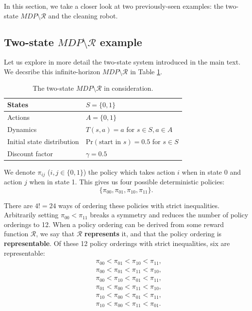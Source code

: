In this section, we take a closer look at two previously-seen examples: the two-state $MDP\setminus \mathcal{R}$ and the cleaning robot. 









\subsection{Two-state $MDP\setminus \mathcal{R}$ example}
Let us explore in more detail the two-state system introduced in the main text.
We decsribe this infinite-horizon $MDP \setminus \mathcal{R}$ in Table \ref{tab:two_state}.

\begin{table}[h!]
\centering
\renewcommand{\arraystretch}{1.2}
\begin{tabular}{| l  l |}
\hline
 States & $S = \{0, 1\}$  \\ 
 \hline
 Actions & $A = \{0, 1\}$  \\  
 \hline
 Dynamics & $T(s, a) = a$ for $s\in S, a\in A$   \\
 \hline
 Initial state distribution & $\text{Pr}(\text{start in } s) = 0.5$ for $s \in S$ \\
 \hline
 Discount factor & $\gamma = 0.5$ \\
 \hline
\end{tabular}
\vspace{2mm}
\caption{The two-state $MDP\setminus \mathcal{R}$ in consideration.}
\label{tab:two_state}
\end{table}


We denote $\pi_{ij}$ ($i,j \in \{0, 1\}$) the policy
which takes action $i$ when in state 0 and action $j$
when in state 1. This gives us four possible deterministic policies:
\begin{equation*}
    \{ \pi_{00}, \pi_{01}, \pi_{10}, \pi_{11} \}.
\end{equation*}
 
There are $4! = 24$ ways of
ordering these policies with strict inequalities.
Arbitrarily setting 
$\pi_{00} < \pi_{11}$ breaks a symmetry and reduces
the number of policy orderings to 12. 
When a policy ordering can be derived from some reward function $\mathcal{R}$, we say that $\mathcal{R}$ \textbf{represents} it, and that the policy ordering is \textbf{representable}.
Of these 12 policy orderings with strict inequalities, six are representable:
\begin{align*}
   & \pi_{00} < \pi_{01} < \pi_{10} < \pi_{11}, \\ %
   & \pi_{00} < \pi_{01} < \pi_{11} < \pi_{10}, \\ %
   & \pi_{00} < \pi_{10} < \pi_{01} < \pi_{11}, \\ %
   & \pi_{01} < \pi_{00} < \pi_{11} < \pi_{10}, \\ %
   & \pi_{10} < \pi_{00} < \pi_{01} < \pi_{11}, \\ %
   & \pi_{10} < \pi_{00} < \pi_{11} < \pi_{01}. %
\end{align*}


